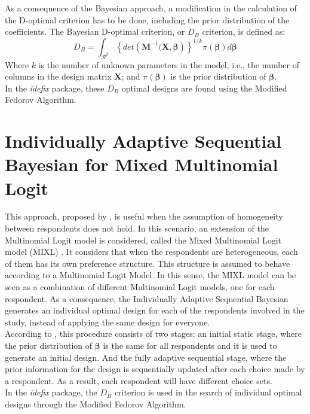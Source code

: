 \documentclass[12pt,a4paper,oneside]{article}
\begin{document}
As a consequence of the Bayesian approach, a modification in the calculation of the D-optimal criterion has to be done, including the prior distribution of the coefficients. The Bayesian D-optimal criterion, or $D_B$ criterion, is defined as:
\begin{equation}
    D_B = \int_{\mathcal{R}^k} \left\{det\left(\mathbf{M}^{-1}(\mathbf{X},\pmb{\beta}\right)\right\}^{1/k}\pi(\pmb{\beta})d\pmb{\beta}
\end{equation}
Where $k$ is the number of unknown parameters in the model, i.e., the number of columns in the design matrix $\mathbf{X}$; and $\pi(\pmb{\beta})$ is the prior distribution of $\pmb{\beta}$.\\
In the \textit{idefix} package, these $D_B$ optimal designs are found using the Modified Fedorov Algorithm.

\section{Individually Adaptive Sequential Bayesian for Mixed Multinomial Logit}
This approach, proposed by \citet{Yu2011}, is useful when the assumption of homogeneity between respondents does not hold. In this scenario, an extension of the Multinomial Logit model is considered, called the Mixed Multinomial Logit model (MIXL) \citep[see][chap. 6]{Train2009}. It considers that when the respondents are heterogeneous, each of them has its own preference structure. This structure is assumed to behave according to a Multinomial Logit Model. In this sense, the MIXL model can be seen as a combination of different Multinomial Logit models, one for each respondent. As a consequence, the Individually Adaptive Sequential Bayesian generates an individual optimal design for each of the respondents involved in the study, instead of applying the same design for everyone. \\

\noindent  According to \citet{Yu2011}, this procedure consists of two stages: an initial static stage, where the prior distribution of $\pmb{\beta}$ is the same for all respondents and it is used to generate an initial design. And the fully adaptive sequential stage, where the prior information for the design is sequentially updated after each choice made by a respondent. As a result, each respondent will have different choice sets.\\

\noindent  In the \textit{idefix} package, the $D_B$ criterion is used in the search of individual optimal designs through the Modified Fedorov Algorithm.
\end{document}
